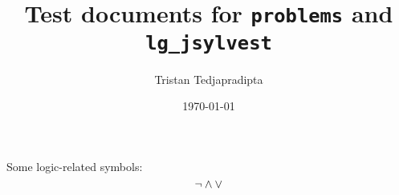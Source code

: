\documentclass[a4paper]{article}
\title{Test documents for \texttt{problems} and \texttt{lg\_jsylvest}}
\author{Tristan Tedjapradipta}
\date{\today}
\begin{document}
    Some logic-related symbols:
    \begin{equation}
        \neg \wedge \vee
    \end{equation}
\end{document}
